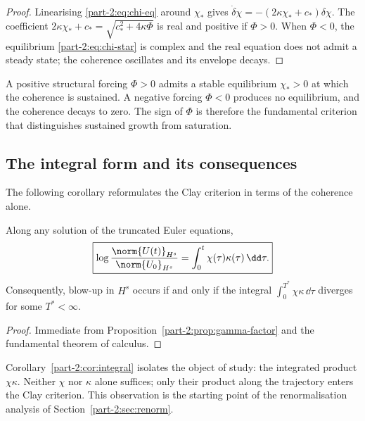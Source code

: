 \begin{proof}
Linearising \eqref{part-2:eq:chi-eq} around $\chi_\ast$ gives 
$\dot\delta\chi = -(2\kappa\chi_\ast + c_\ast)\delta\chi$. The 
coefficient $2\kappa\chi_\ast + c_\ast = \sqrt{c_\ast^2 + 4\kappa\Phi}$ 
is real and positive if $\Phi>0$. When $\Phi<0$, the equilibrium 
\eqref{part-2:eq:chi-star} is complex and the real equation does not admit a 
steady state; the coherence oscillates and its envelope decays.
\end{proof}

\begin{remark}[Interpretation]\label{part-2:rem:stability-interpretation}
A positive structural forcing $\Phi>0$ admits a stable equilibrium 
$\chi_\ast>0$ at which the coherence is sustained. A negative forcing 
$\Phi<0$ produces no equilibrium, and the coherence decays to zero. 
The sign of $\Phi$ is therefore the fundamental criterion that 
distinguishes sustained growth from saturation.
\end{remark}

\subsection{The integral form and its consequences}
\label{part-2:ssec:integral}

The following corollary reformulates the Clay criterion in terms of 
the coherence alone.

\begin{corollary}\label{part-2:cor:integral}
Along any solution of the truncated Euler equations,
\begin{equation}\label{part-2:eq:integral-criterion}
\boxed{
\log\frac{\norm{U(t)}_{H^s}}{\norm{U_0}_{H^s}} 
= \int_0^t \chi(\tau)\kappa(\tau)\,\dd\tau.
}
\end{equation}
Consequently, blow-up in $H^s$ occurs if and only if the integral 
$\int_0^{T^\ast}\chi\kappa\,\dd\tau$ diverges for some $T^\ast<\infty$.
\end{corollary}

\begin{proof}
Immediate from Proposition~\ref{part-2:prop:gamma-factor} and the 
fundamental theorem of calculus.
\end{proof}

\begin{remark}\label{part-2:rem:isolated}
Corollary~\ref{part-2:cor:integral} isolates the object of study: the 
integrated product $\chi\kappa$. Neither $\chi$ nor $\kappa$ alone 
suffices; only their product along the trajectory enters the Clay 
criterion. This observation is the starting point of the 
renormalisation analysis of Section~\ref{part-2:sec:renorm}.
\end{remark}

